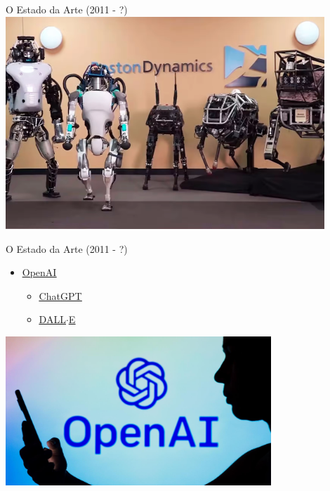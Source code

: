 \documentclass{libs/ufc_format}
\begin{document}
\begin{frame}{O Estado da Arte (2011 - ?)}
    \centering
    \includegraphics[width=0.9\textwidth]{figuras/boston_dynamics}
\end{frame}

\begin{frame}{O Estado da Arte (2011 - ?)}
    \begin{itemize}
        \item \href{https://openai.com/}{\underline{OpenAI}}
            \begin{itemize}
                \item \href{https://openai.com/blog/chatgpt/}{\underline{ChatGPT}}
                \item \href{https://openai.com/dall-e-2/}{\underline{DALL$\cdot$E}}
            \end{itemize}
    \end{itemize}
    \centering
    \includegraphics[width=0.75\textwidth]{figuras/openai}
\end{frame}
\end{document}
